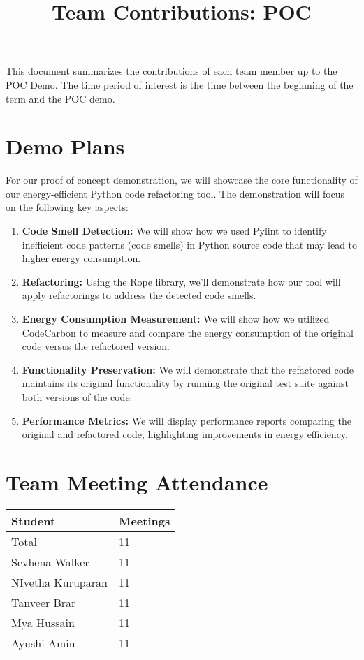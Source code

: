 \documentclass{article}
\title{Team Contributions: POC\\\progname}
\author{\authname}
\date{}
\begin{document}
\maketitle

This document summarizes the contributions of each team member up to the POC
Demo.  The time period of interest is the time between the beginning of the term
and the POC demo.

\section{Demo Plans}

For our proof of concept demonstration, we will showcase the core functionality of our energy-efficient 
Python code refactoring tool. The demonstration will focus on the following key aspects:
\begin{enumerate}

    \item \textbf{Code Smell Detection:} We will show how we used Pylint to identify inefficient code 
    patterns (code smells) in Python source code that may lead to higher energy consumption.
    \item \textbf{Refactoring:} Using the Rope library, we'll demonstrate how our tool will 
    apply refactorings to address the detected code smells.
    \item \textbf{Energy Consumption Measurement:} We will show how we utilized CodeCarbon to measure 
    and compare the energy consumption of the original code versus the refactored version.
    \item \textbf{Functionality Preservation:} We will demonstrate that the refactored code 
    maintains its original functionality by running the original test suite against both versions of the code.
    \item \textbf{Performance Metrics:} We will display performance reports comparing the original and refactored 
    code, highlighting improvements in energy efficiency.
    
\end{enumerate}

\section{Team Meeting Attendance}

\begin{table}[H]
\centering
\begin{tabular}{ll}
\toprule
\textbf{Student} & \textbf{Meetings}\\
\midrule
Total & 11\\
Sevhena Walker & 11\\
NIvetha Kuruparan & 11\\
Tanveer Brar & 11\\
Mya Hussain & 11\\
Ayushi Amin & 11\\
\bottomrule
\end{tabular}
\end{table}
\end{document}
